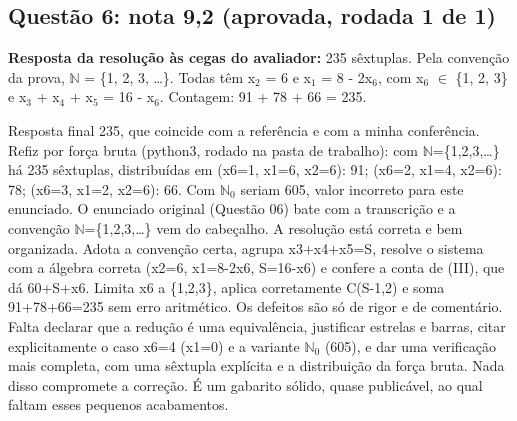 \documentclass{article}%
\begin{document}
\subsection*{Questão 6: nota 9,2 (aprovada, rodada 1 de 1)}%
\textbf{Resposta da resolução às cegas do avaliador:} 235 sêxtuplas. Pela convenção da prova, $\mathbb{N}$ = \{1, 2, 3, \ldots{}\}. Todas têm x$_{2}$ = 6 e x$_{1}$ = 8 - 2x$_{6}$, com x$_{6}$ $\in$ \{1, 2, 3\} e x$_{3}$ + x$_{4}$ + x$_{5}$ = 16 - x$_{6}$. Contagem: 91 + 78 + 66 = 235.\par %
Resposta final 235, que coincide com a referência e com a minha conferência. Refiz por força bruta (python3, rodado na pasta de trabalho): com $\mathbb{N}$=\{1,2,3,\ldots{}\} há 235 sêxtuplas, distribuídas em (x6=1, x1=6, x2=6): 91; (x6=2, x1=4, x2=6): 78; (x6=3, x1=2, x2=6): 66. Com $\mathbb{N}$$_{0}$ seriam 605, valor incorreto para este enunciado. O enunciado original (Questão 06) bate com a transcrição e a convenção $\mathbb{N}$=\{1,2,3,\ldots{}\} vem do cabeçalho. A resolução está correta e bem organizada. Adota a convenção certa, agrupa x3+x4+x5=S, resolve o sistema com a álgebra correta (x2=6, x1=8-2x6, S=16-x6) e confere a conta de (III), que dá 60+S+x6. Limita x6 a \{1,2,3\}, aplica corretamente C(S-1,2) e soma 91+78+66=235 sem erro aritmético. Os defeitos são só de rigor e de comentário. Falta declarar que a redução é uma equivalência, justificar estrelas e barras, citar explicitamente o caso x6=4 (x1=0) e a variante $\mathbb{N}$$_{0}$ (605), e dar uma verificação mais completa, com uma sêxtupla explícita e a distribuição da força bruta. Nada disso compromete a correção. É um gabarito sólido, quase publicável, ao qual faltam esses pequenos acabamentos.%
\end{document}
